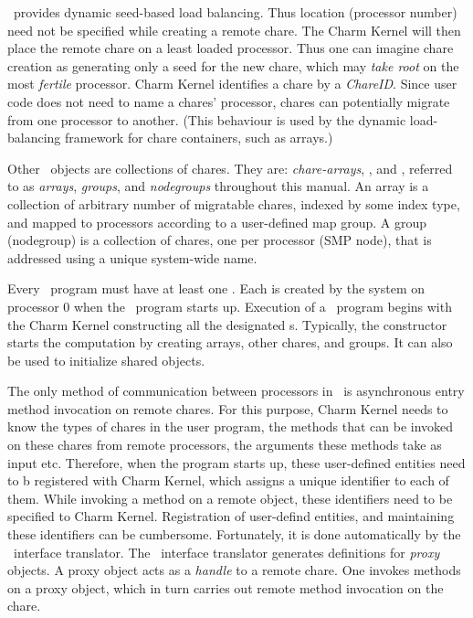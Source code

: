 \charmpp\ provides dynamic seed-based load balancing. Thus location (processor
number) need not be specified while creating a remote chare. The
Charm Kernel will then place the remote chare on a least loaded processor. Thus
one can imagine chare creation as generating only a seed for the new chare,
which may {\em take root} on the most {\em fertile} processor. Charm Kernel
identifies a chare by a {\em ChareID}.  Since user code does not
need to name a chares' processor, chares can potentially migrate from one
processor to another.  (This behaviour is used by the dynamic load-balancing
framework for chare containers, such as arrays.)

Other \charmpp\ objects are collections of chares. They are: {\em
chare-arrays}, , and , referred to as {\em arrays}, {\em groups}, and {\em
nodegroups} throughout this manual. An array is a collection of arbitrary
number of migratable chares, indexed by some index type, and mapped to
processors according to a user-defined map group. A group (nodegroup) is a
collection of chares, one per processor (SMP node), that is addressed using
a unique system-wide name.

Every \charmpp\ program must have at least one .  Each
 is created by the system on processor 0 when the \charmpp\
program starts up.  Execution of a \charmpp\ program begins with the Charm
Kernel constructing all the designated s.  Typically, the
\kw{mainchare} constructor starts the computation by creating arrays, other
chares, and groups.  It can also be used to initialize shared \kw{readonly}
objects.

The only method of communication between processors in \charmpp\ is
asynchronous \index{entry method} entry method invocation on remote chares.
For this purpose, Charm Kernel needs to know the types of
chares in the user program, the methods that can be invoked on
these chares from remote processors, the arguments these methods take as
input etc. Therefore, when the program starts up, these user-defined
entities need to b registered with Charm Kernel, which assigns a unique
identifier to each of them. While invoking a method on a remote object,
these identifiers need to be specified to Charm Kernel. Registration of
user-defind entities, and maintaining these identifiers can be cumbersome.
Fortunately, it is done automatically by the \charmpp\ interface translator.
The \charmpp\ interface translator generates definitions for {\em proxy}
objects. A proxy object acts as a {\em handle} to a remote chare. One
invokes methods on a proxy object, which in turn carries out remote method
invocation on the chare.

